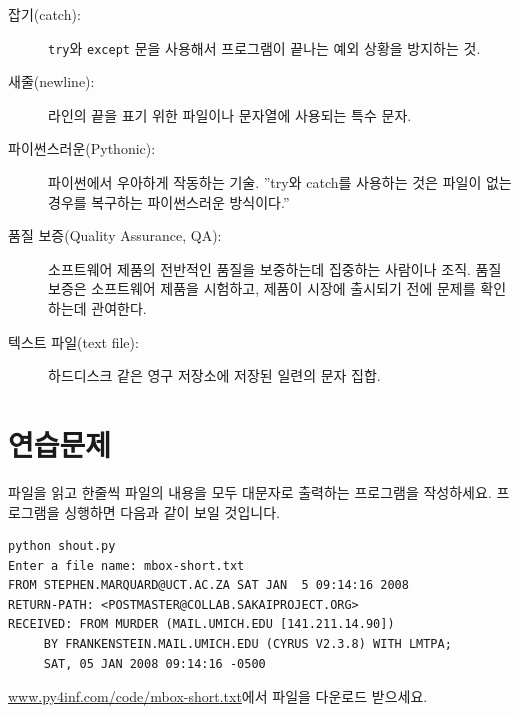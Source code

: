 \begin{description}

\item[잡기(catch):] {\tt try}와 {\tt except} 문을 사용해서 프로그램이 끝나는 예외 상황을 방지하는 것.

\item[새줄(newline):] 라인의 끝을 표기 위한 파일이나 문자열에 사용되는 특수 문자.

\item[파이썬스러운(Pythonic):] 파이썬에서 우아하게 작동하는 기술. ''try와 catch를 사용하는 것은 파일이 없는 경우를 복구하는 파이썬스러운 방식이다.''

\item[품질 보증(Quality Assurance, QA):] 소프트웨어 제품의 전반적인 품질을 보중하는데 집중하는 사람이나 조직.
품질 보증은 소프트웨어 제품을 시험하고, 제품이 시장에 출시되기 전에 문제를 확인하는데 관여한다.

\item[텍스트 파일(text file):] 하드디스크 같은 영구 저장소에 저장된 일련의 문자 집합.

\end{description}

\section{연습문제}

\begin{ex}
파일을 읽고 한줄씩 파일의 내용을 모두 대문자로 출력하는 프로그램을 작성하세요.
프로그램을 싱행하면 다음과 같이 보일 것입니다.

\beforeverb
\begin{verbatim}
python shout.py
Enter a file name: mbox-short.txt
FROM STEPHEN.MARQUARD@UCT.AC.ZA SAT JAN  5 09:14:16 2008
RETURN-PATH: <POSTMASTER@COLLAB.SAKAIPROJECT.ORG>
RECEIVED: FROM MURDER (MAIL.UMICH.EDU [141.211.14.90])
	 BY FRANKENSTEIN.MAIL.UMICH.EDU (CYRUS V2.3.8) WITH LMTPA;
	 SAT, 05 JAN 2008 09:14:16 -0500
\end{verbatim}
\afterverb
%
\url{www.py4inf.com/code/mbox-short.txt}에서 파일을 다운로드 받으세요.
\end{ex}

